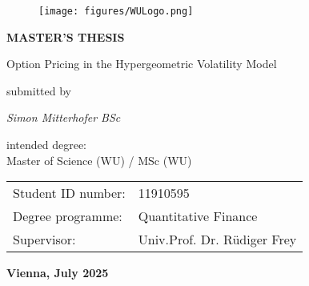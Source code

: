 \documentclass[a4paper,11pt]{article}
\begin{document}

\thispagestyle{empty}
\begin{figure}[h!]
    \raggedleft
    \texttt{[image: figures/WULogo.png]}
\end{figure}


\begin{center}
    \textbf{\huge MASTER’S THESIS} \\
    \vspace{1.5cm}

    \LARGE Option Pricing in the Hypergeometric Volatility Model \\
    \vspace{2.5cm}
    
    \normalsize submitted by \\
    \vspace{0.5cm}
    
    \textit{\Large Simon Mitterhofer BSc}
    \vspace{2cm}
    
    intended degree: \\
    \Large Master of Science (WU) / MSc (WU)
        \\
\vspace{1cm}
\normalsize

    \begin{tabular}{ll}
        Student ID number: & 11910595 \\
        Degree programme: & Quantitative Finance \\
        Supervisor: & Univ.Prof. Dr. Rüdiger Frey \\
    \end{tabular}
    \vspace{2cm}
    
    \textbf{Vienna, July 2025}
\end{center}

\newpage


\tableofcontents








\appendix


\end{document}
